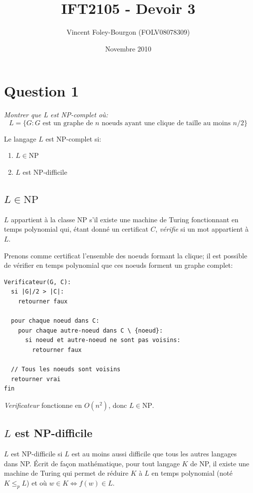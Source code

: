\documentclass[10pt]{article}
\newcommand{\NP}{\text{NP}}
\begin{document}
\title{IFT2105 - Devoir 3}
\date{Novembre 2010}
\author{Vincent Foley-Bourgon (FOLV08078309)}
\maketitle

\section{Question 1}

\emph{Montrer que L est NP-complet où:}
\[
L = \{ G : G \text{ est un graphe de $n$ noeuds ayant une clique de
  taille au moins $n/2$} \}
\]

Le langage $L$ est NP-complet si:
\begin{enumerate}
  \item $L \in \NP$
  \item $L$ est NP-difficile
\end{enumerate}

\subsection{$L \in \NP$}

$L$ appartient à la classe NP s'il existe une machine de Turing
fonctionnant en temps polynomial qui, étant donné un certificat $C$,
\emph{vérifie} si un mot appartient à $L$.

Prenons comme certificat l'ensemble des noeuds formant la clique; il
est possible de vérifier en temps polynomial que ces noeuds forment un
graphe complet:

\begin{verbatim}
Verificateur(G, C):
  si |G|/2 > |C|:
    retourner faux

  pour chaque noeud dans C:
    pour chaque autre-noeud dans C \ {noeud}:
      si noeud et autre-noeud ne sont pas voisins:
        retourner faux

  // Tous les noeuds sont voisins
  retourner vrai
fin
\end{verbatim}

\emph{Verificateur} fonctionne en $O(n^2)$, donc $L \in \NP$.

\subsection{$L$ est NP-difficile}

$L$ est NP-difficile si $L$ est au moins aussi difficile que tous les
autres langages dans NP.  Écrit de façon mathématique, pour tout
langage $K$ de NP, il existe une machine de Turing qui permet de
réduire $K$ à $L$ en temps polynomial (noté $K \le_p L$) et où $w
\in K \iff f(w) \in L$.
\end{document}
